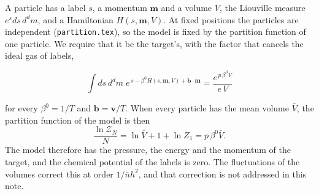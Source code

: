 \documentclass[11pt,aps,preprint,nofootinbib,superscriptaddress,tightenlines]{revtex4-2}
\def\st{\begin{equation}}
\def\stp{\end{equation}}
\begin{document}
A particle has a label $s$, a momentum $\bm m$ and a volume $V$, the Liouville measure $e^{s}ds\,d^dm$, and a Hamiltonian $H(s,\bm m,V)$.  At
fixed positions the particles are independent (\nolinkurl{partition.tex}), so the model is fixed by the partition function of one particle.  We
require that it be the target's, with the factor that cancels the ideal gas of labels,
\begin{keyeq}
\st
\int ds\,d^dm\;e^{\,s-\beta^0H(s,\bm m,V)+\bm b\cdot\bm m}=\frac{e^{\,p\,\beta^0V}}{e\,V}
\label{condition}
\stp
\end{keyeq}
for every $\beta^0=1/T$ and $\bm b=\bm v/T$.  When every particle has the mean volume $\bar V$, the partition function of the model is then
\st
\frac{\ln\mathcal Z_N}N=\ln\bar V+1+\ln Z_1=p\,\beta^0\bar V .
\stp
The model therefore has the pressure, the energy and the momentum of the target, and the
chemical potential of the labels is zero.  The fluctuations of the volumes correct this at order $1/\bar nh^2$, and that correction is not
addressed in this note.
\end{document}
